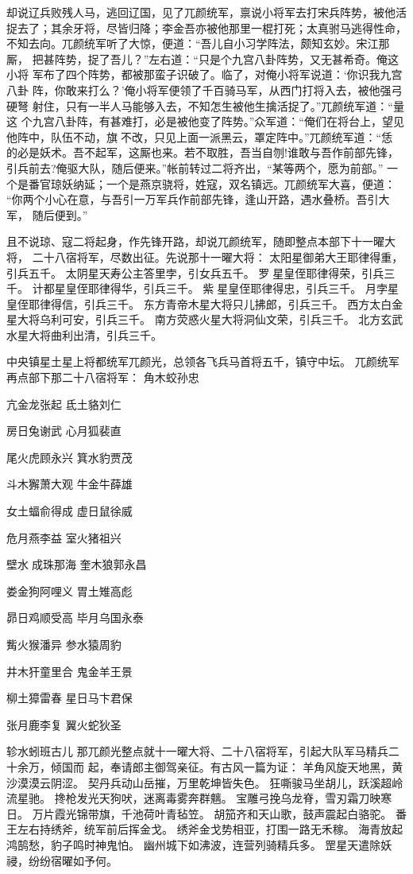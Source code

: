 却说辽兵败残人马，逃回辽国，见了兀颜统军，禀说小将军去打宋兵阵势，被他活
捉去了；其余牙将，尽皆归降；李金吾亦被他那里一棍打死；太真驸马逃得性命，
不知去向。兀颜统军听了大惊，便道：“吾儿自小习学阵法，颇知玄妙。宋江那厮，
把甚阵势，捉了吾儿？”左右道：“只是个九宫八卦阵势，又无甚希奇。俺这小将
军布了四个阵势，都被那蛮子识破了。临了，对俺小将军说道：‘你识我九宫八卦
阵，你敢来打么？’俺小将军便领了千百骑马军，从西门打将入去，被他强弓硬弩
射住，只有一半人马能够入去，不知怎生被他生擒活捉了。”兀颜统军道：“量这
个九宫八卦阵，有甚难打，必是被他变了阵势。”众军道：“俺们在将台上，望见
他阵中，队伍不动，旗不改，只见上面一派黑云，罩定阵中。”兀颜统军道：“恁
的必是妖术。吾不起军，这厮也来。若不取胜，吾当自刎!谁敢与吾作前部先锋，
引兵前去?俺驱大队，随后便来。”帐前转过二将齐出，“某等两个，愿为前部。”
一个是番官琼妖纳延；一个是燕京骁将，姓寇，双名镇远。兀颜统军大喜，便道：
“你两个小心在意，与吾引一万军兵作前部先锋，逢山开路，遇水叠桥。吾引大军，
随后便到。”

且不说琼、寇二将起身，作先锋开路，却说兀颜统军，随即整点本部下十一曜大将，
二十八宿将军，尽数出征。先说那十一曜大将：
太阳星御弟大王耶律得重，引兵五千。
太阴星天寿公主答里孛，引女兵五千。
罗星皇侄耶律得荣，引兵三千。
计都星皇侄耶律得华，引兵三千。
紫星皇侄耶律得忠，引兵三千。
月孛星皇侄耶律得信，引兵三千。
东方青帝木星大将只儿拂郎，引兵三千。
西方太白金星大将乌利可安，引兵三千。
南方荧惑火星大将洞仙文荣，引兵三千。
北方玄武水星大将曲利出清，引兵三千。

中央镇星土星上将都统军兀颜光，总领各飞兵马首将五千，镇守中坛。
兀颜统军再点部下那二十八宿将军：
角木蛟孙忠

亢金龙张起
氐土貉刘仁

房日兔谢武
心月狐裴直

尾火虎顾永兴
箕水豹贾茂

斗木獬萧大观
牛金牛薛雄

女土蝠俞得成
虚日鼠徐威

危月燕李益
室火猪祖兴

壁水成珠那海
奎木狼郭永昌

娄金狗阿哩义
胃土雉高彪

昴日鸡顺受高
毕月乌国永泰

觜火猴潘异
参水猿周豹

井木犴童里合
鬼金羊王景

柳土獐雷春
星日马卞君保

张月鹿李复
翼火蛇狄圣

轸水蚓班古儿
那兀颜光整点就十一曜大将、二十八宿将军，引起大队军马精兵二十余万，倾国而
起，奉请郎主御驾亲征。有古风一篇为证：
羊角风旋天地黑，黄沙漠漠云阴涩。
契丹兵动山岳摧，万里乾坤皆失色。
狂嘶骏马坐胡儿，跃溪超岭流星驰。
搀枪发光天狗吠，迷离毒雾奔群魑。
宝雕弓挽乌龙脊，雪刃霜刀映寒日。
万片霞光锦带旗，千池荷叶青毡笠。
胡笳齐和天山歌，鼓声震起白骆驼。
番王左右持绣斧，统军前后挥金戈。
绣斧金戈势相亚，打围一路无禾稼。
海青放起鸿鹄愁，豹子鸣时神鬼怕。
幽州城下如沸波，连营列骑精兵多。
罡星天遣除妖祲，纷纷宿曜如予何。

